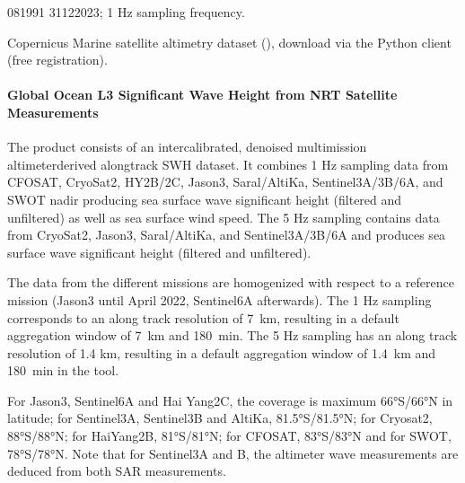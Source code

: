 \documentclass[a4paper,10pt,english]{sphinxmanual}
\begin{document}
\sphinxAtStartPar
{}

\sphinxhyphen{}08\sphinxhyphen{}1991 \sphinxhyphen{} 31\sphinxhyphen{}12\sphinxhyphen{}2023; 1 Hz sampling frequency.

\sphinxAtStartPar
{}

\sphinxAtStartPar
Copernicus Marine satellite altimetry dataset (), download via the  Python client (free registration).


\paragraph{Global Ocean L3 Significant Wave Height from NRT Satellite Measurements}
\label{\detokenize{05_reference_datasets:global-ocean-l3-significant-wave-height-from-nrt-satellite-measurements}}
\sphinxAtStartPar
{}

\sphinxAtStartPar
The product consists of an inter\sphinxhyphen{}calibrated, denoised multi\sphinxhyphen{}mission altimeter\sphinxhyphen{}derived along\sphinxhyphen{}track SWH dataset. It combines 1 Hz sampling data from CFOSAT, CryoSat\sphinxhyphen{}2, HY\sphinxhyphen{}2B/2C, Jason\sphinxhyphen{}3, Saral/AltiKa, Sentinel\sphinxhyphen{}3A/3B/6A, and SWOT nadir producing sea surface wave significant height (filtered and unfiltered) as well as sea surface wind speed. The 5 Hz sampling contains data from CryoSat\sphinxhyphen{}2, Jason\sphinxhyphen{}3, Saral/AltiKa, and Sentinel\sphinxhyphen{}3A/3B/6A and produces sea surface wave significant height (filtered and unfiltered).

\sphinxAtStartPar
{}

\sphinxAtStartPar
The data from the different missions are homogenized with respect to a reference mission (Jason\sphinxhyphen{}3 until April 2022, Sentinel\sphinxhyphen{}6A afterwards). The 1 Hz sampling corresponds to an along track resolution of 7 km, resulting in a default aggregation window of 7 km and 180 min. The 5 Hz sampling has an along track resolution of 1.4 km, resulting in a default aggregation window of 1.4 km and 180 min in the  tool.

\sphinxAtStartPar
For Jason\sphinxhyphen{}3, Sentinel\sphinxhyphen{}6A and Hai Yang\sphinxhyphen{}2C, the coverage is maximum 66°S/66°N in latitude; for Sentinel\sphinxhyphen{}3A, Sentinel\sphinxhyphen{}3B and AltiKa, 81.5°S/81.5°N; for Cryosat\sphinxhyphen{}2, 88°S/88°N; for HaiYang\sphinxhyphen{}2B, 81°S/81°N; for CFOSAT, 83°S/83°N and for SWOT, 78°S/78°N. Note that for Sentinel\sphinxhyphen{}3A and B, the altimeter wave measurements are deduced from both SAR measurements.
\end{document}
